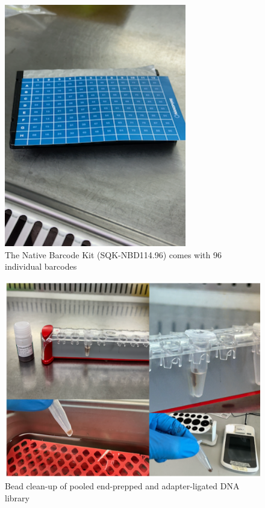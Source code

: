 \documentclass[
]{book}
\begin{document}
\begin{figure}
\centering
\includegraphics[width=3.125in,height=\textheight]{./img/barcode_ligation.png}
\caption{The Native Barcode Kit (SQK-NBD114.96) comes with 96 individual barcodes}
\end{figure}

\hfill\break

\begin{figure}
\centering
\includegraphics[width=5.20833in,height=\textheight]{./img/libraryprepcleanup_comb.png}
\caption{Bead clean-up of pooled end-prepped and adapter-ligated DNA library}
\end{figure}
\end{document}

